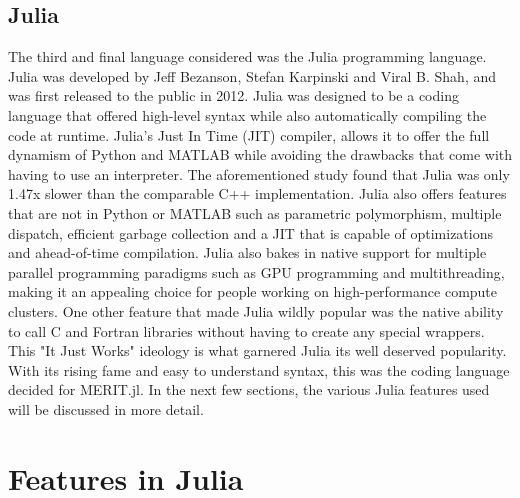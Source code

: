 \subsection{Julia}
The third and final language considered was the Julia programming language. Julia was developed by Jeff Bezanson, Stefan
Karpinski and Viral B. Shah, and was first released to the public in 2012. Julia was designed to be a coding language
that offered high-level syntax while also automatically compiling the code at runtime. Julia's Just In Time (JIT) compiler,
allows it to offer the full dynamism of Python and MATLAB while avoiding the drawbacks that come with having to use an
interpreter. The aforementioned study found that Julia was only 1.47x slower than the comparable C++ implementation.
Julia also offers features that are not in Python or MATLAB such as parametric polymorphism, multiple dispatch,
efficient garbage collection and a JIT that is capable of optimizations and ahead-of-time compilation. Julia also bakes
in native support for multiple parallel programming paradigms such as GPU programming and multithreading, making it an
appealing choice for people working on high-performance compute clusters. One other feature that made Julia wildly
popular was the native ability to call C and Fortran libraries without having to create any special wrappers. This "It
Just Works" ideology is what garnered Julia its well deserved popularity. With its rising fame and easy to understand
syntax, this was the coding language decided for MERIT.jl. In the next few sections, the various Julia features used
will be discussed in more detail. \hfill \break

\section{Features in Julia}
